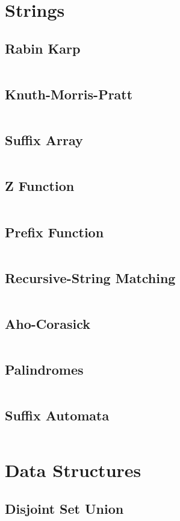 \documentclass[a4paper, 10pt, twocolumn, landscape]{article}
\begin{document}
\section{Strings}
\subsection{Rabin Karp}
\inputminted{cpp}{strings/rabin-karp.cpp}
\subsection{Knuth-Morris-Pratt}
\inputminted{cpp}{strings/kmp.cpp}
\subsection{Suffix Array}
\inputminted{cpp}{strings/suffix-array.cpp}
\subsection{Z Function}
\inputminted{cpp}{strings/z.cpp}
\subsection{Prefix Function}
\inputminted{cpp}{strings/prefix.cpp}
\subsection{Recursive-String Matching}
\inputminted{cpp}{strings/recursive-string-matching.cpp}
\subsection{Aho-Corasick}
\inputminted{cpp}{strings/aho.cpp}
\subsection{Palindromes}
\inputminted{cpp}{strings/manacher.cpp}
\subsection{Suffix Automata}
\inputminted{cpp}{strings/suffix-automaton.cpp}

\section{Data Structures}
\subsection{Disjoint Set Union}
\inputminted{cpp}{data-structures/dsu.cpp}
\end{document}
